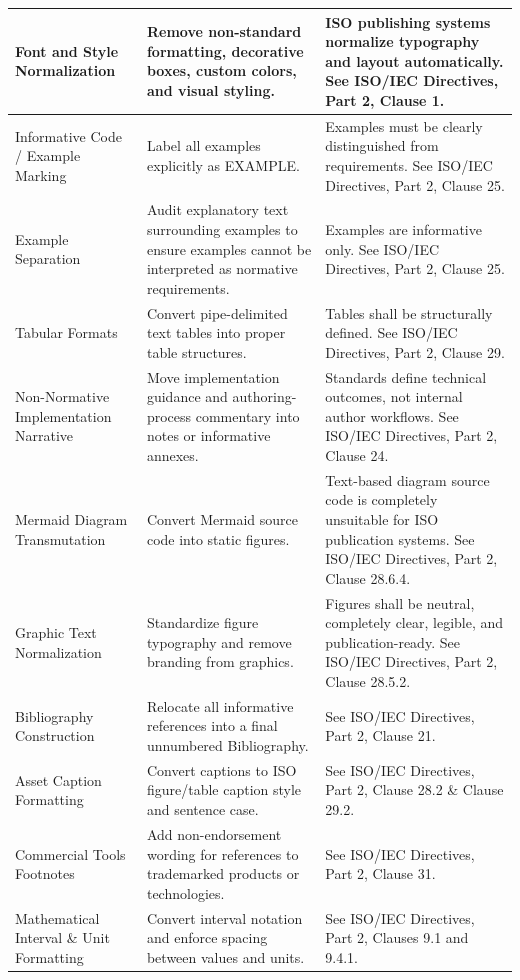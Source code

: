 \documentclass[11pt,a4paper]{article}
\begin{document}
\begin{table}[h]
\begin{tabular}{|l|l|l|}
Font and Style Normalization & Remove non-standard formatting, decorative boxes, custom colors, and visual styling. & ISO publishing systems normalize typography and layout automatically. See ISO/IEC Directives, Part 2, Clause 1. \\ \hline
Informative Code / Example Marking & Label all examples explicitly as EXAMPLE. & Examples must be clearly distinguished from requirements. See ISO/IEC Directives, Part 2, Clause 25. \\ \hline
Example Separation & Audit explanatory text surrounding examples to ensure examples cannot be interpreted as normative requirements. & Examples are informative only. See ISO/IEC Directives, Part 2, Clause 25. \\ \hline
Tabular Formats & Convert pipe-delimited text tables into proper table structures. & Tables shall be structurally defined. See ISO/IEC Directives, Part 2, Clause 29. \\ \hline
Non-Normative Implementation Narrative & Move implementation guidance and authoring-process commentary into notes or informative annexes. & Standards define technical outcomes, not internal author workflows. See ISO/IEC Directives, Part 2, Clause 24. \\ \hline
Mermaid Diagram Transmutation & Convert Mermaid source code into static figures. & Text-based diagram source code is completely unsuitable for ISO publication systems. See ISO/IEC Directives, Part 2, Clause 28.6.4. \\ \hline
Graphic Text Normalization & Standardize figure typography and remove branding from graphics. & Figures shall be neutral, completely clear, legible, and publication-ready. See ISO/IEC Directives, Part 2, Clause 28.5.2. \\ \hline
Bibliography Construction & Relocate all informative references into a final unnumbered Bibliography. & See ISO/IEC Directives, Part 2, Clause 21. \\ \hline
Asset Caption Formatting & Convert captions to ISO figure/table caption style and sentence case. & See ISO/IEC Directives, Part 2, Clause 28.2 \& Clause 29.2. \\ \hline
Commercial Tools Footnotes & Add non-endorsement wording for references to trademarked products or technologies. & See ISO/IEC Directives, Part 2, Clause 31. \\ \hline
Mathematical Interval \& Unit Formatting & Convert interval notation and enforce spacing between values and units. & See ISO/IEC Directives, Part 2, Clauses 9.1 and 9.4.1. \\ \hline

\end{tabular}
\end{table}
\end{document}
